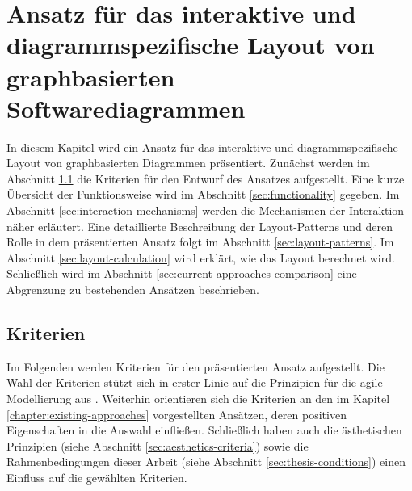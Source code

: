 
\chapter{Ansatz für das interaktive und diagrammspezifische Layout von graphbasierten Softwarediagrammen}
\label{chapter:interactive-approach}

In diesem Kapitel wird ein Ansatz für das interaktive und diagrammspezifische Layout von graphbasierten Diagrammen präsentiert. Zunächst werden im Abschnitt \ref{sec:criteria} die Kriterien für den Entwurf des Ansatzes aufgestellt. Eine kurze Übersicht der Funktionsweise wird im Abschnitt \ref{sec:functionality} gegeben. Im Abschnitt \ref{sec:interaction-mechanisms} werden die Mechanismen der Interaktion näher erläutert. Eine detaillierte Beschreibung der Layout-Patterns und deren Rolle in dem präsentierten Ansatz folgt im Abschnitt \ref{sec:layout-patterns}. Im Abschnitt \ref{sec:layout-calculation} wird erklärt, wie das Layout berechnet wird. Schließlich wird im Abschnitt \ref{sec:current-approaches-comparison} eine Abgrenzung zu bestehenden Ansätzen beschrieben.


\section{Kriterien}
\label{sec:criteria}

Im Folgenden werden Kriterien für den präsentierten Ansatz aufgestellt. Die Wahl der Kriterien stützt sich in erster Linie auf die Prinzipien für die agile Modellierung aus \cite{Ambler02Agile}. Weiterhin orientieren sich die Kriterien an den im Kapitel \ref{chapter:existing-approaches} vorgestellten Ansätzen, deren positiven Eigenschaften in die Auswahl einfließen.   Schließlich haben auch die ästhetischen Prinzipien (siehe Abschnitt \ref{sec:aesthetics-criteria}) sowie die Rahmenbedingungen dieser Arbeit (siehe Abschnitt \ref{sec:thesis-conditions}) einen Einfluss auf die gewählten Kriterien.

